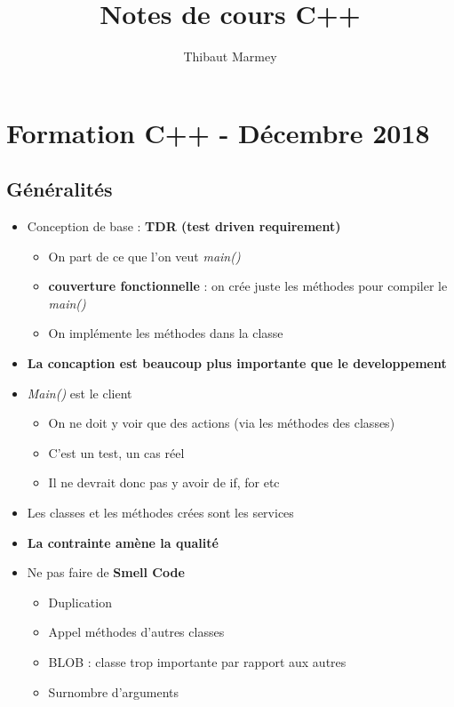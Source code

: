 \documentclass[12pt,a4paper]{article}
\author{Thibaut Marmey}
\title{Notes de cours C++}
\begin{document}
	\maketitle

\begin{normalsize}
\tableofcontents
\end{normalsize}

\section{Formation C++ - Décembre 2018}
\subsection{Généralités}
\begin{itemize}
\item Conception de base : \textbf{TDR (test driven requirement)}
\begin{itemize}
\item On part de ce que l'on veut \textit{main()}
\item\textbf{couverture fonctionnelle} : on crée juste les méthodes pour compiler le \textit{main()}
\item On implémente les méthodes dans la classe
\end{itemize}
\item \textbf{La concaption est beaucoup plus importante que le developpement}
\item \textit{Main()} est le client
\begin{itemize}
\item On ne doit y voir que des actions (via les méthodes des classes)
\item C'est un test, un cas réel
\item Il ne devrait donc pas y avoir de if, for etc
\end{itemize}
\item Les classes et les méthodes crées sont les services
\item \textbf{La contrainte amène la qualité}
\item Ne pas faire de \textbf{Smell Code}
\begin{itemize}
\item Duplication
\item Appel méthodes d'autres classes
\item BLOB : classe trop importante par rapport aux autres
\item Surnombre d'arguments
\end{itemize}

\end{itemize}
\end{document}
